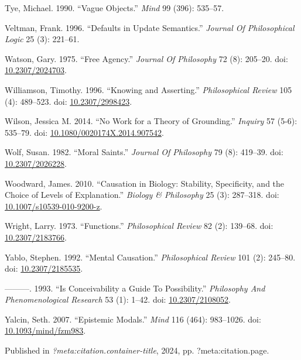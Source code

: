 \documentclass[
  10pt,
  letterpaper,
  DIV=11,
  numbers=noendperiod,
  twoside]{scrartcl}
\newlength{\cslhangindent}
\newenvironment{CSLReferences}[2] %
 {\begin{list}{}{%
  \setlength{\itemindent}{0pt}
  \setlength{\leftmargin}{0pt}
  \setlength{\parsep}{0pt}
  \ifodd #1
   \setlength{\leftmargin}{\cslhangindent}
   \setlength{\itemindent}{-1\cslhangindent}
  \fi
  \setlength{\itemsep}{#2\baselineskip}}}
 {\end{list}}
\begin{document}
\begin{CSLReferences}{1}{0}
Tye, Michael. 1990. {``Vague Objects.''} \emph{Mind} 99 (396): 535--57.

Veltman, Frank. 1996. {``Defaults in Update Semantics.''} \emph{Journal
Of Philosophical Logic} 25 (3): 221--61.

Watson, Gary. 1975. {``Free Agency.''} \emph{Journal Of Philosophy} 72
(8): 205--20. doi:
\href{https://doi.org/10.2307/2024703}{10.2307/2024703}.

Williamson, Timothy. 1996. {``Knowing and Asserting.''}
\emph{Philosophical Review} 105 (4): 489--523. doi:
\href{https://doi.org/10.2307/2998423}{10.2307/2998423}.

Wilson, Jessica M. 2014. {``No Work for a Theory of Grounding.''}
\emph{Inquiry} 57 (5-6): 535--79. doi:
\href{https://doi.org/10.1080/0020174X.2014.907542}{10.1080/0020174X.2014.907542}.

Wolf, Susan. 1982. {``Moral Saints.''} \emph{Journal Of Philosophy} 79
(8): 419--39. doi:
\href{https://doi.org/10.2307/2026228}{10.2307/2026228}.

Woodward, James. 2010. {``Causation in Biology: Stability, Specificity,
and the Choice of Levels of Explanation.''} \emph{Biology \& Philosophy}
25 (3): 287--318. doi:
\href{https://doi.org/10.1007/s10539-010-9200-z}{10.1007/s10539-010-9200-z}.

Wright, Larry. 1973. {``Functions.''} \emph{Philosophical Review} 82
(2): 139--68. doi:
\href{https://doi.org/10.2307/2183766}{10.2307/2183766}.

Yablo, Stephen. 1992. {``Mental Causation.''} \emph{Philosophical
Review} 101 (2): 245--80. doi:
\href{https://doi.org/10.2307/2185535}{10.2307/2185535}.

---------. 1993. {``Is Conceivability a Guide To Possibility.''}
\emph{Philosophy And Phenomenological Research} 53 (1): 1--42. doi:
\href{https://doi.org/10.2307/2108052}{10.2307/2108052}.

Yalcin, Seth. 2007. {``Epistemic Modals.''} \emph{Mind} 116 (464):
983--1026. doi:
\href{https://doi.org/10.1093/mind/fzm983}{10.1093/mind/fzm983}.

\end{CSLReferences}



\noindent Published in\emph{
?meta:citation.container-title}, 2024, pp. ?meta:citation.page.
\end{document}
